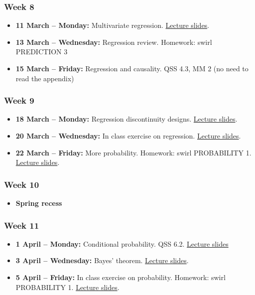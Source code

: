 \documentclass[a4paper,12pt]{article}
\begin{document}
\subsubsection*{Week 8}

\begin{itemize}
	\item \textbf{11 March -- Monday:} Multivariate regression. \href{https://pols1600.github.io/slides/week08a/week08a.html}{Lecture slides}.
	\item \textbf{13 March -- Wednesday:} Regression review. Homework: swirl PREDICTION 3
	\item \textbf{15 March -- Friday:} Regression and causality. QSS 4.3, MM 2 (no need to read the appendix) 
\end{itemize}

\subsubsection*{Week 9}

\begin{itemize}
	\item \textbf{18 March -- Monday:} Regression discontinuity designs. \href{https://pols1600.github.io/slides/week09a/week09a.html}{Lecture slides}.
	\item \textbf{20 March -- Wednesday:} In class exercise on regression. \href{https://pols1600.github.io/slides/week09b/week09b.html}{Lecture slides}.
	\item \textbf{22 March -- Friday:} More probability. Homework: swirl PROBABILITY 1. \href{https://pols1600.github.io/slides/week09c/week09c.html}{Lecture slides}. 
\end{itemize}

\subsubsection*{Week 10}

\begin{itemize}
	\item \textbf{Spring recess} 
\end{itemize}


\subsubsection*{Week 11}

\begin{itemize}
	\item \textbf{1 April -- Monday:} Conditional probability. QSS 6.2. \href{https://pols1600.github.io/slides/week10a/week10a.html}{Lecture slides}
	\item \textbf{3 April -- Wednesday:} Bayes' theorem. \href{https://pols1600.github.io/slides/week10b/week10b.html}{Lecture slides}.
	\item \textbf{5 April -- Friday:} In class exercise on probability. Homework: swirl PROBABILITY 1. \href{https://pols1600.github.io/slides/week10c/week10c.html}{Lecture slides}.
\end{itemize}
\end{document}
